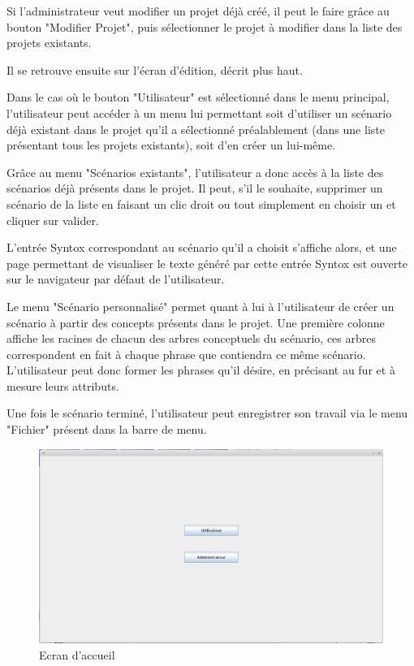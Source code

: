 \documentclass[12pt]{report}
\begin{document}
Si l'administrateur veut modifier un projet déjà créé, il peut le faire grâce au bouton "Modifier Projet", puis sélectionner le projet à modifier dans la liste des projets existants.

Il se retrouve ensuite sur l'écran d'édition, décrit plus haut.

\bigskip

Dans le cas où le bouton "Utilisateur" est sélectionné dans le menu principal, l'utilisateur peut accéder à un menu lui permettant soit d'utiliser un scénario déjà existant dans le projet qu'il a sélectionné préalablement (dans une liste présentant tous les projets existants), soit d'en créer un lui-même.

Grâce au menu "Scénarios existants", l'utilisateur a donc accès à la liste des scénarios déjà présents dans le projet. Il peut, s'il le souhaite, supprimer un scénario de la liste en faisant un clic droit ou tout simplement en choisir un et cliquer sur valider.

L'entrée Syntox correspondant au scénario qu'il a choisit s'affiche alors, et une page permettant de visualiser le texte généré par cette entrée Syntox est ouverte sur le navigateur par défaut de l'utilisateur.

\bigskip

Le menu "Scénario personnalisé" permet quant à lui à l'utilisateur de créer un scénario à partir des concepts présents dans le projet. Une première colonne affiche les racines de chacun des arbres conceptuels du scénario, ces arbres correspondent en fait à chaque phrase que contiendra ce même scénario. L'utilisateur peut donc former les phrases qu'il désire, en précisant au fur et à mesure leurs attributs.

Une fois le scénario terminé, l'utilisateur peut enregistrer son travail via le menu "Fichier" présent dans la barre de menu.

\begin{figure}[h!]
\centering
\includegraphics[scale=0.3]{IHM/accueil.png}
\caption{Ecran d'accueil}
\end{figure}
\end{document}
